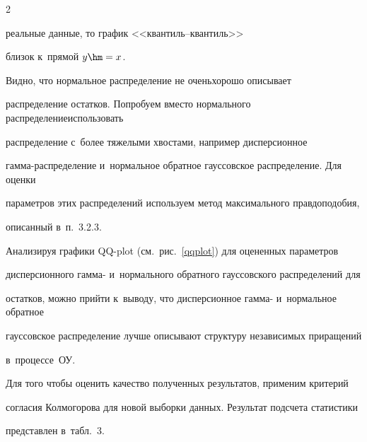\begin{multicols}{2}





\noindent


 реальные данные, то график <<кван\-тиль--кван\-тиль>> 


близок к~прямой $y \hm= x$.








        Видно, что нормальное распределение не очень\linebreak хорошо описывает 


распределение остатков. По\-пробуем вместо нормального распределение\linebreak использовать 


распределение с~более тяжелыми хвостами, например дисперсионное 


гам\-ма-рас\-пре\-де\-ле\-ние и~нормальное обратное гауссовское распределение. Для оценки 


параметров этих распределений используем метод максимального правдоподобия, 


описанный в~п.~3.2.3.





       





        Анализируя графики QQ-plot (см.\ рис.~\ref{qqplot}) для оцененных параметров 


дисперсионного гамма- и~нормального обратного гауссовского распределений для 


остатков, можно прийти к~выводу, что дисперсионное гамма- и~нормальное обратное 


гауссовское распределение лучше описывают структуру независимых приращений 


в~процессе~ОУ.





        Для того чтобы оценить качество полученных результатов, применим критерий 


согласия Колмогорова для новой выборки данных. Результат подсчета статистики 


представлен в~табл.~3.












\end{multicols}

